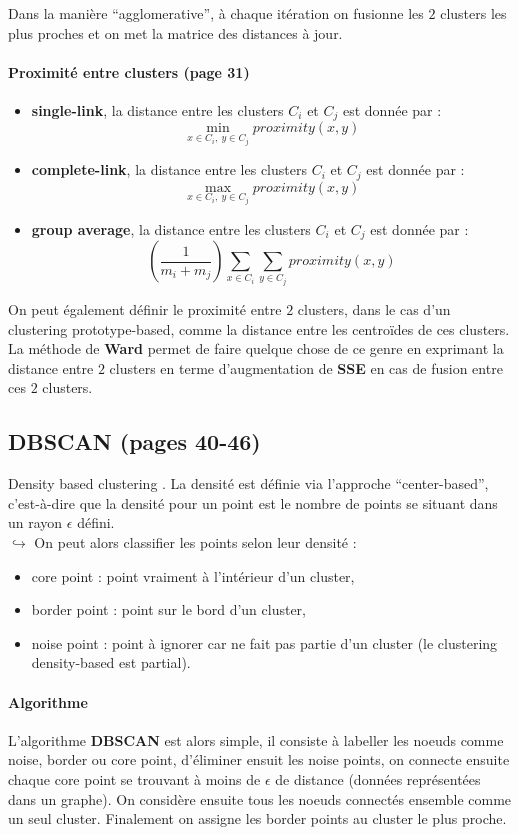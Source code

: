 \documentclass{article}
\begin{document}
\begin{sffamily}
Dans la manière ``agglomerative'', à chaque itération on fusionne les $2$ clusters les plus proches et on met la matrice des distances à 
jour.

\paragraph{Proximité entre clusters (page 31)}

\begin{itemize}
\item \textbf{single-link}, la distance entre les clusters $C_i$ et $C_j$ est donnée par : $$\min_{x\in C_i,\ y\in C_j} proximity(x,y)$$
\item \textbf{complete-link}, la distance entre les clusters $C_i$ et $C_j$ est donnée par : $$\max_{x\in C_i,\ y\in C_j} proximity(x,y)$$
\item \textbf{group average}, la distance entre les clusters $C_i$ et $C_j$ est donnée par : $$\left(\frac{1}{m_i+m_j}\right) \sum_{x\in 
C_i}\sum_{y\in C_j} proximity(x,y)$$
\end{itemize}

On peut également définir le proximité entre $2$ clusters, dans le cas d'un clustering prototype-based, comme la distance entre les
centroïdes de ces clusters. La méthode de \textbf{Ward} permet de faire quelque chose de ce genre en exprimant la distance entre $2$ 
clusters en terme d'augmentation de \textbf{SSE} en cas de fusion entre ces $2$ clusters.

\subsection{DBSCAN (pages 40-46)}

Density based clustering . La densité est définie via l'approche ``center-based'', c'est-à-dire que la densité pour un point est le nombre
de points se situant dans un rayon $\epsilon$ défini.\\
$\hookrightarrow$ On peut alors classifier les points selon leur densité :
\begin{itemize}
\item core point : point vraiment à l'intérieur d'un cluster,
\item border point : point sur le bord d'un cluster,
\item noise point : point à ignorer car ne fait pas partie d'un cluster (le clustering density-based est partial).
\end{itemize}

\paragraph{Algorithme} L'algorithme \textbf{DBSCAN} est alors simple, il consiste à labeller les noeuds comme noise, border ou core point, 
d'éliminer ensuit les noise points, on connecte ensuite chaque core point se trouvant à moins de $\epsilon$ de distance (données 
représentées dans un graphe). On considère ensuite tous les noeuds connectés ensemble comme un seul cluster. Finalement on assigne les 
border points au cluster le plus proche.


\end{sffamily}
\end{document}
